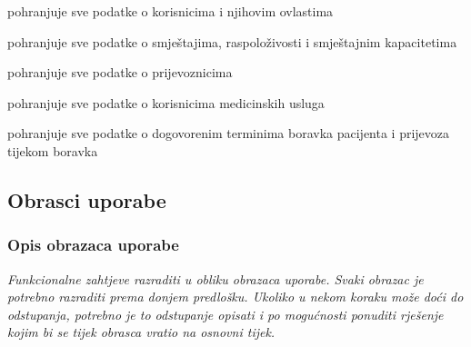 \begin{packed_enum}
					\item  {}
				\begin{packed_enum}
					\item pohranjuje sve podatke o korisnicima i njihovim ovlastima
					\item pohranjuje sve podatke o smještajima, raspoloživosti i smještajnim kapacitetima
					\item pohranjuje sve podatke o prijevoznicima
					\item pohranjuje sve podatke o korisnicima medicinskih usluga
					\item pohranjuje sve podatke o dogovorenim terminima boravka pacijenta i prijevoza tijekom boravka
				\end{packed_enum}
			\end{packed_enum}
			\eject 
			
			
			
			\subsection{Obrasci uporabe}
				
				\subsubsection{Opis obrazaca uporabe}
					\textit{Funkcionalne zahtjeve razraditi u obliku obrazaca uporabe. Svaki obrazac je potrebno razraditi prema donjem predlošku. Ukoliko u nekom koraku može doći do odstupanja, potrebno je to odstupanje opisati i po mogućnosti ponuditi rješenje kojim bi se tijek obrasca vratio na osnovni tijek.}\\
					
